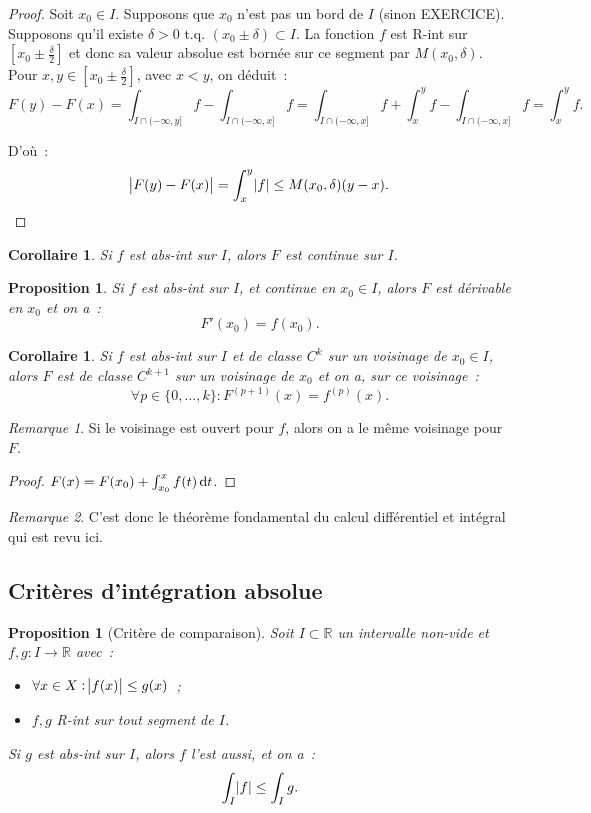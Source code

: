 \documentclass{report}
\newtheorem{prp}[thm]{Proposition}
\newtheorem{cor}[thm]{Corollaire}
\theoremstyle{definition}
\theoremstyle{remark}
\newtheorem*{rmq}{Remarque}
\newcommand{\R}{\mathbb R}
\newcommand{\tq}{\text{ t.q. }}
\newcommand{\minfty}{{-\infty}}
\begin{document}
			\begin{proof} Soit $x_0 \in I$. Supposons que $x_0$ n'est pas un bord de $I$ (sinon EXERCICE). Supposons qu'il existe
			$\delta > 0 \tq (x_0 \pm \delta) \subset I$. La fonction $f$ est R-int sur $\left[x_0 \pm \frac \delta2\right]$ et donc sa valeur absolue est bornée sur
			ce segment par $M(x_0, \delta)$. Pour $x, y \in \left[x_0 \pm \frac \delta2\right]$, avec $x < y$, on déduit~:
			\[F(y) - F(x) = \int_{I \cap (\minfty, y]} f - \int_{I \cap (-\infty, x]} f
				= \int_{I \cap (\minfty, x]} f + \int_x^y f - \int_{I \cap (\minfty, x]} f = \int_x^y f.\]

			D'où~:
			\[\abs {F(y) - F(x)} = \int_x^y\abs f \leq M(x_0, \delta)(y-x).\]
			\end{proof}

			\begin{cor} Si $f$ est abs-int sur $I$, alors $F$ est continue sur $I$.
			\end{cor}

			\begin{prp} Si $f$ est abs-int sur $I$, et continue en $x_0 \in I$, alors $F$ est dérivable en $x_0$ et on a~:
			\[F'(x_0) = f(x_0).\]
			\end{prp}

			\begin{cor} Si $f$ est abs-int sur $I$ et de classe $C^k$ sur un voisinage de $x_0 \in I$, alors $F$ est de classe $C^{k+1}$ sur un voisinage de
			$x_0$ et on a, sur ce voisinage~:
			\[\forall p \in \{0, \ldots, k\} : F^{(p+1)}(x) = f^{(p)}(x).\]
			\end{cor}

			\begin{rmq} Si le voisinage est ouvert pour $f$, alors on a le même voisinage pour $F$.
			\end{rmq}

			\begin{proof} $F(x) = F(x_0) + \int_{x_0}^x f(t)\dif t$.
			\end{proof}

			\begin{rmq} C'est donc le théorème fondamental du calcul différentiel et intégral qui est revu ici.
			\end{rmq}

		\subsection{Critères d'intégration absolue}
			\begin{prp}[Critère de comparaison]\label{prp:critèredecomparaison} Soit $I \subset \R$ un intervalle non-vide et $f, g : I \to \R$ avec~:
			\begin{itemize}
				\item $\forall x \in X : \abs {f(x)} \leq g(x)$~;
				\item $f, g$ R-int sur tout segment de $I$.
			\end{itemize}

			Si $g$ est abs-int sur $I$, alors $f$ l'est aussi, et on a~:
			\[\int_I\abs f \leq \int_I g.\]
			\end{prp}
\end{document}
